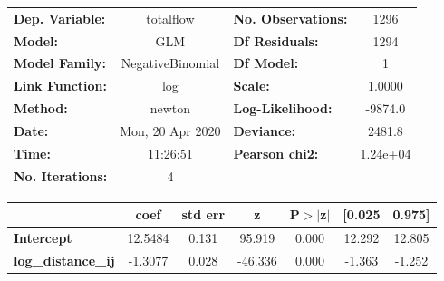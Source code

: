 \begin{center}
\begin{tabular}{lclc}
\toprule
\textbf{Dep. Variable:}    &    totalflow     & \textbf{  No. Observations:  } &     1296    \\
\textbf{Model:}            &       GLM        & \textbf{  Df Residuals:      } &     1294    \\
\textbf{Model Family:}     & NegativeBinomial & \textbf{  Df Model:          } &        1    \\
\textbf{Link Function:}    &       log        & \textbf{  Scale:             } &    1.0000   \\
\textbf{Method:}           &      newton      & \textbf{  Log-Likelihood:    } &   -9874.0   \\
\textbf{Date:}             & Mon, 20 Apr 2020 & \textbf{  Deviance:          } &    2481.8   \\
\textbf{Time:}             &     11:26:51     & \textbf{  Pearson chi2:      } &  1.24e+04   \\
\textbf{No. Iterations:}   &        4         & \textbf{                     } &             \\
\bottomrule
\end{tabular}
\begin{tabular}{lcccccc}
                           & \textbf{coef} & \textbf{std err} & \textbf{z} & \textbf{P$> |$z$|$} & \textbf{[0.025} & \textbf{0.975]}  \\
\midrule
\textbf{Intercept}         &      12.5484  &        0.131     &    95.919  &         0.000        &       12.292    &       12.805     \\
\textbf{log\_distance\_ij} &      -1.3077  &        0.028     &   -46.336  &         0.000        &       -1.363    &       -1.252     \\
\bottomrule
\end{tabular}
\end{center}